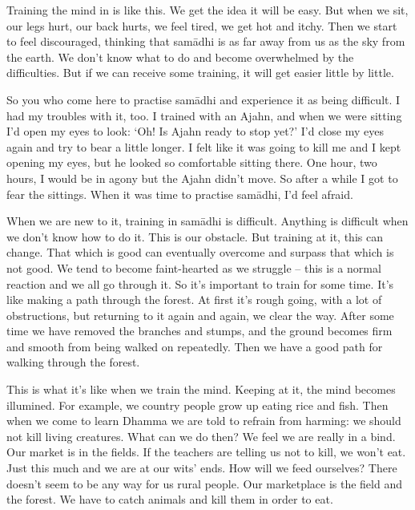 Training the mind in  is like this. We get the idea it will be easy. But when we sit, our legs hurt, our back hurts, we feel tired, we get hot and itchy. Then we start to feel discouraged, thinking that sam\=adhi is as far away from us as the sky from the earth. We don't know what to do and become overwhelmed by the difficulties. But if we can receive some training, it will get easier little by little. 

So you who come here to practise sam\=adhi and experience it as being difficult. I had my troubles with it, too. I trained with an Ajahn, and when we were sitting I'd open my eyes to look: `Oh! Is Ajahn ready to stop yet?' I'd close my eyes again and try to bear a little longer. I felt like it was going to kill me and I kept opening my eyes, but he looked so comfortable sitting there. One hour, two hours, I would be in agony but the Ajahn didn't move. So after a while I got to fear the sittings. When it was time to practise sam\=adhi, I'd feel afraid. 

When we are new to it, training in sam\=adhi is difficult. Anything is difficult when we don't know how to do it. This is our obstacle. But \mbox{training} at it, this can change. That which is good can eventually overcome and surpass that which is not good. We tend to become faint-hearted as we struggle -- this is a normal reaction and we all go through it. So it's important to train for some time. It's like making a path through the forest. At first it's rough going, with a lot of obstructions, but returning to it again and again, we clear the way. After some time we have removed the branches and stumps, and the ground becomes firm and smooth from being walked on repeatedly. Then we have a good path for walking through the forest. 

This is what it's like when we train the mind. Keeping at it, the mind becomes illumined. For example, we country people grow up eating rice and fish. Then when we come to learn Dhamma we are told to refrain from harming: we should not kill living creatures. What can we do then? We feel we are really in a bind. Our market is in the fields. If the teachers are telling us not to kill, we won't eat. Just this much and we are at our wits' ends. How will we feed ourselves? There doesn't seem to be any way for us rural people. Our marketplace is the field and the forest. We have to catch animals and kill them in order to eat. 

